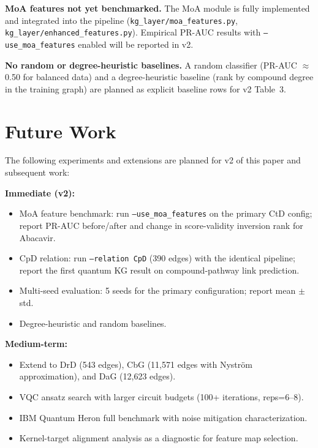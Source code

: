 \documentclass[twocolumn,10pt]{article}
\begin{document}
\textbf{MoA features not yet benchmarked.} The MoA module is fully implemented and integrated into the pipeline (\texttt{kg\_layer/moa\_features.py}, \texttt{kg\_layer/enhanced\_features.py}). Empirical PR-AUC results with \texttt{--use\_moa\_features} enabled will be reported in v2.

\textbf{No random or degree-heuristic baselines.} A random classifier (PR-AUC $\approx$ 0.50 for balanced data) and a degree-heuristic baseline (rank by compound degree in the training graph) are planned as explicit baseline rows for v2 Table~3.

\section{Future Work}

The following experiments and extensions are planned for v2 of this paper and subsequent work:

\textbf{Immediate (v2):}
\begin{itemize}[leftmargin=*]
\item MoA feature benchmark: run \texttt{--use\_moa\_features} on the primary CtD config; report PR-AUC before/after and change in score-validity inversion rank for Abacavir.
\item CpD relation: run \texttt{--relation CpD} (390 edges) with the identical pipeline; report the first quantum KG result on compound-pathway link prediction.
\item Multi-seed evaluation: 5 seeds for the primary configuration; report mean $\pm$ std.
\item Degree-heuristic and random baselines.
\end{itemize}

\textbf{Medium-term:}
\begin{itemize}[leftmargin=*]
\item Extend to DrD (543 edges), CbG (11,571 edges with Nystr\"{o}m approximation), and DaG (12,623 edges).
\item VQC ansatz search with larger circuit budgets (100+ iterations, reps=6--8).
\item IBM Quantum Heron full benchmark with noise mitigation characterization.
\item Kernel-target alignment analysis as a diagnostic for feature map selection.
\end{itemize}
\end{document}
